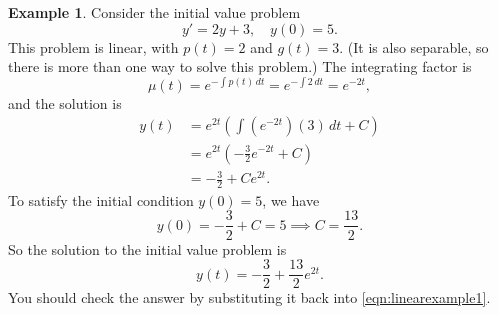 \documentclass[reqno]{immbook}
\numberwithin{equation}{chapter}
\numberwithin{question}{section}
\numberwithin{theorem}{chapter}
\numberwithin{figure}{chapter}
\theoremstyle{definition}
\newtheorem{example}{Example}[section]
\begin{document}
\begin{example}
Consider the initial value problem
\begin{equation}
   y' = 2y + 3, \quad y(0) = 5.
\label{eqn:linearexample1}
\end{equation}
This problem is linear, with $p(t)=2$ and $g(t) = 3$.
(It is also separable, so there is more than one way
to solve this problem.)
The integrating factor is
\begin{equation}
   \mu(t) = e^{-\int p(t)\,dt} = e^{-\int 2\, dt}
      = e^{-2t},
\end{equation}
and the solution is
\begin{equation}
\begin{split}
   y(t) & = e^{2t} \left( \int \left(e^{-2t}\right)\left(3\right)\,dt + C\right) \\
        & = e^{2t} \left( -\frac{3}{2} e^{-2t} +C \right) \\
	& = -\frac{3}{2} + Ce^{2t}.
\end{split}
\end{equation}
To satisfy the initial condition $y(0)=5$, we have
\begin{equation}
   y(0) = -\frac{3}{2} + C = 5 \implies C = \frac{13}{2} .
\end{equation}
So the solution to the initial value problem is
\begin{equation}
   y(t) = -\frac{3}{2} + \frac{13}{2}e^{2t}.
\end{equation}
You should check the answer by substituting it back
into \eqref{eqn:linearexample1}.
\end{example}
\end{document}
